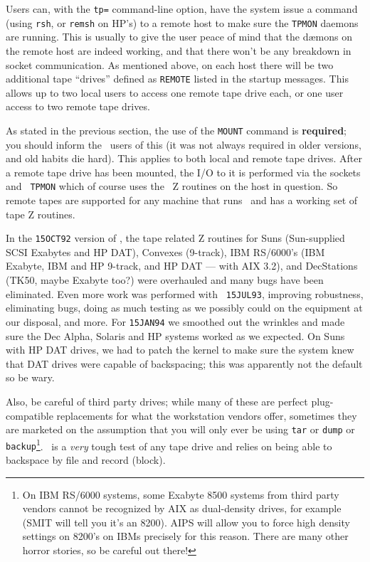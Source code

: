 Users can, with the {\tt tp=} command-line option, have the system issue
a command (using {\tt rsh}, or {\tt remsh} on HP's) to a remote host to
make sure the {\tt TPMON} daemons are running.  This is usually to give
the user peace of mind that the d\ae mons on the remote host are indeed
working, and that there won't be any breakdown in socket communication.
As mentioned above, on each host there will be two additional tape
``drives'' defined as {\tt REMOTE} listed in the startup messages.  This
allows up to two local users to access one remote tape drive each, or
one user access to two remote tape drives.

As stated in the previous section, the use of the {\tt MOUNT} command is
{\bf required}; you should inform the \AIPS\ users of this (it was not
always required in older versions, and old habits die hard).  This
applies to both local and remote tape drives.  After a remote tape drive
has been mounted, the I/O to it is performed via the sockets and {\tt
TPMON} which of course uses the \AIPS\ Z routines on the host in
question.  So remote tapes are supported for any machine that runs
\AIPS\ and has a working set of tape Z routines.

In the {\tt 15OCT92} version of \AIPS, the tape related Z routines for
Suns (Sun-supplied SCSI Exabytes and HP DAT), Convexes (9-track), IBM
RS/6000's (IBM Exabyte, IBM and HP 9-track, and HP DAT --- with AIX
3.2), and DecStations (TK50, maybe Exabyte too?) were overhauled and
many bugs have been eliminated.  Even more work was performed with {\tt
15JUL93}, improving robustness, eliminating bugs, doing as much testing
as we possibly could on the equipment at our disposal, and more.  For
{\tt 15JAN94} we smoothed out the wrinkles and made sure the Dec Alpha,
Solaris and HP systems worked as we expected.  On Suns with HP DAT
drives, we had to patch the kernel to make sure the system knew that DAT
drives were capable of backspacing; this was apparently not the default
so be wary.

Also, be careful of third party drives; while many of these are perfect
plug-compatible replacements for what the workstation vendors offer,
sometimes they are marketed on the assumption that you will only ever be
using {\tt tar} or {\tt dump} or {\tt backup}\footnote*{\eightpoint
        On IBM RS/6000 systems, some Exabyte 8500 systems from third
        party vendors cannot be recognized by AIX as dual-density
        drives, for example (SMIT will tell you it's an 8200).  AIPS
        will allow you to force high density settings on 8200's on IBMs
        precisely for this reason.  There are many other horror stories,
        so be careful out there!}.
\AIPS\ is a {\it very\/} tough test of any tape drive and relies on
being able to backspace by file and record (block).
\medskip

